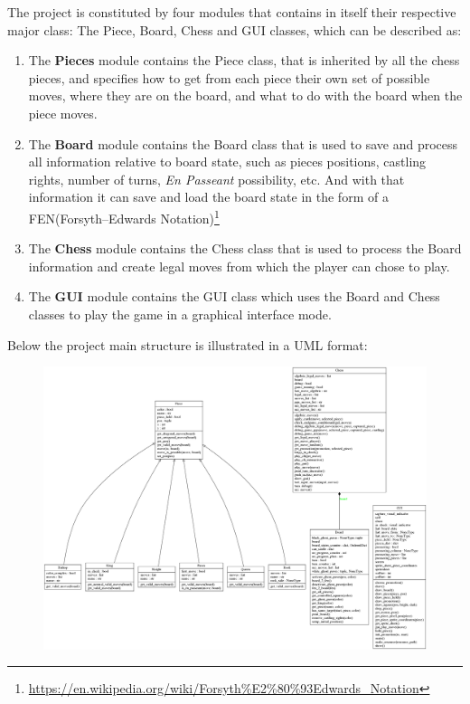 \documentclass[10pt]{article}
\begin{document}
The project is constituted by four modules that contains in itself their
respective major class: The Piece, Board, Chess and GUI classes, which can be
described as:
\begin{enumerate}
    \item The \textbf{Pieces} module contains the Piece class, that is inherited by all
        the chess pieces, and specifies how to get from each piece their own set
        of possible moves, where they are on the board, and what to do with
        the board when the piece moves.
        \item The \textbf{Board} module contains the Board class that is used to save and
            process all
            information relative to board state, such as pieces positions,
            castling rights, number of turns, \textit{En Passeant} possibility, etc.
            And with that information it can save and load the board state
            in the form of a FEN(Forsyth–Edwards
            Notation)\footnote{\url{https://en.wikipedia.org/wiki/Forsyth\%E2\%80\%93Edwards_Notation}}
        \item The \textbf{Chess} module contains the Chess class that is used to process
            the Board information and create legal moves from which the player
            can chose to play.
        \item The \textbf{GUI} module contains the GUI class which uses the Board and Chess classes to play the game in a graphical interface mode.
\end{enumerate}

Below the project main structure is illustrated in a UML format:

\begin{figure}[H]
    \includegraphics[scale=0.25]{fig/classes_Chess.png}
\end{figure}
\end{document}
